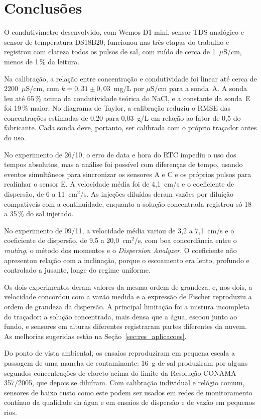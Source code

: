 \documentclass[12pt,a4paper]{article}
\providecommand{\uScm}{\ensuremath{\mu}S/cm}
\begin{document}
\section{Conclusões}
\label{sec:conclusoes-expC}

O condutivímetro desenvolvido, com Wemos D1 mini, sensor TDS analógico e sensor de temperatura DS18B20, funcionou nas três etapas do trabalho e registrou com clareza todos os pulsos de sal, com ruído de cerca de 1~\uScm, menos de 1\,\% da leitura.

Na calibração, a relação entre concentração e condutividade foi linear até cerca de 2200~\uScm, com $k = 0{,}31 \pm 0{,}03$~mg/L por \uScm{} para a sonda~A. A sonda leu até 65\,\% acima da condutividade teórica do NaCl, e a constante da sonda~E foi 19\,\% maior. No diagrama de Taylor, a calibração reduziu o RMSE das concentrações estimadas de 0,20 para 0,03~g/L em relação ao fator de 0,5 do fabricante. Cada sonda deve, portanto, ser calibrada com o próprio traçador antes do uso.

No experimento de 26/10, o erro de data e hora do RTC impediu o uso dos tempos absolutos, mas a análise foi possível com diferenças de tempo, usando eventos simultâneos para sincronizar os sensores A e C e os próprios pulsos para realinhar o sensor E. A velocidade média foi de 4,1~cm/s e o coeficiente de dispersão, de 6 a 11~cm$^2$/s. As injeções diluídas deram vazões por diluição compatíveis com a continuidade, enquanto a solução concentrada registrou só 18 a 35\,\% do sal injetado.

No experimento de 09/11, a velocidade média variou de 3,2 a 7,1~cm/s e o coeficiente de dispersão, de 9,5 a 20,0~cm$^2$/s, com boa concordância entre o \emph{routing}, o método dos momentos e o \emph{Dispersion Analyzer}. O coeficiente não apresentou relação com a inclinação, porque o escoamento era lento, profundo e controlado a jusante, longe do regime uniforme.

Os dois experimentos deram valores da mesma ordem de grandeza, e, nos dois, a velocidade concordou com a vazão medida e a expressão de Fischer reproduziu a ordem de grandeza da dispersão. A principal limitação foi a mistura incompleta do traçador: a solução concentrada, mais densa que a água, escoou junto ao fundo, e sensores em alturas diferentes registraram partes diferentes da nuvem. As melhorias sugeridas estão na Seção~\ref{sec:res_aplicacoes}.

Do ponto de vista ambiental, os ensaios reproduziram em pequena escala a passagem de uma mancha de contaminante: 16~g de sal produziram por alguns segundos concentrações de cloreto acima do limite da Resolução CONAMA 357/2005, que depois se diluíram. Com calibração individual e relógio comum, sensores de baixo custo como este podem ser usados em redes de monitoramento contínuo da qualidade da água e em ensaios de dispersão e de vazão em pequenos rios.
\end{document}
